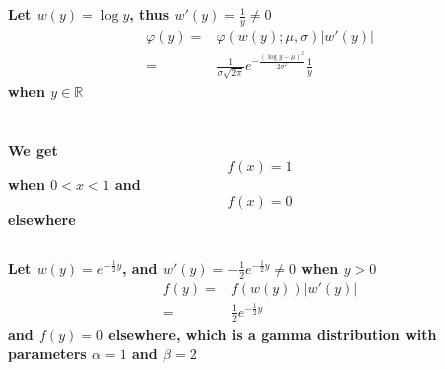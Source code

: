 \documentclass{article}
\begin{document}
    \section{}
        \paragraph{
            Let $w(y)=\log y$, thus $w'(y)=\frac{1}{y}\neq 0$
            \begin{equation*}
                \begin{split}
                    \varphi(y)=&\varphi(w(y);\mu,\sigma)|w'(y)|\\
                        =&\frac{1}{\sigma\sqrt{2\pi}}e^{-\frac{(\log y-\mu)^2}{2\sigma^2}}\frac{1}{y}
                \end{split}
            \end{equation*}
            when $y\in \mathbb{R}$
        }

    \section{}
        \paragraph{
            We get
            $$f(x)=1$$
            when $0<x<1$
            and $$f(x)=0$$ elsewhere
        }
        \subsection{}
            \paragraph{
                Let $w(y)=e^{-\frac{1}{2}y}$, and $w'(y)=-\frac{1}{2}e^{-\frac{1}{2}y}\neq 0$ when $y>0$
                \begin{equation*}
                    \begin{split}
                        f(y)=&f(w(y))|w'(y)|\\
                            =&\frac{1}{2}e^{-\frac{1}{2}y}
                    \end{split}
                \end{equation*}
                and $f(y)=0$ elsewhere,
                which is a gamma distribution with parameters $\alpha=1$ and $\beta=2$
            }
        \subsection{}
\end{document}
